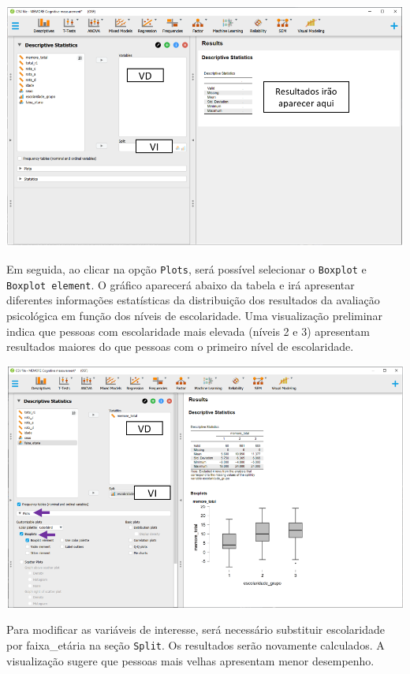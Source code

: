 \documentclass[
]{book}
\begin{document}
\includegraphics{./img/cap_anova_two_way_descriptives2.png}

Em seguida, ao clicar na opção \texttt{Plots}, será possível selecionar o \texttt{Boxplot} e \texttt{Boxplot\ element}. O gráfico aparecerá abaixo da tabela e irá apresentar diferentes informações estatísticas da distribuição dos resultados da avaliação psicológica em função dos níveis de escolaridade. Uma visualização preliminar indica que pessoas com escolaridade mais elevada (níveis 2 e 3) apresentam resultados maiores do que pessoas com o primeiro nível de escolaridade.

\includegraphics{./img/cap_anova_two_way_plot.png}

Para modificar as variáveis de interesse, será necessário substituir escolaridade por faixa\_etária na seção \texttt{Split}. Os resultados serão novamente calculados. A visualização sugere que pessoas mais velhas apresentam menor desempenho.
\end{document}
